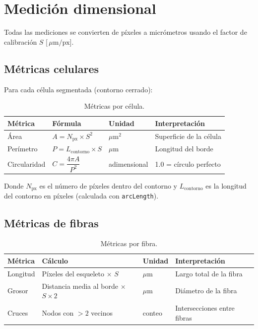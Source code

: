 \documentclass[11pt,a4paper]{article}
\newcommand{\umpx}{\,\mu\text{m/px}}
\begin{document}
\section{Medici\'{o}n dimensional}

Todas las mediciones se convierten de p\'{i}xeles a micr\'{o}metros usando el factor de calibraci\'{o}n $S$ [$\umpx$].

\subsection{M\'{e}tricas celulares}

Para cada c\'{e}lula segmentada (contorno cerrado):

\begin{table}[H]
\centering
\begin{tabular}{llll}
\toprule
\textbf{M\'{e}trica} & \textbf{F\'{o}rmula} & \textbf{Unidad} & \textbf{Interpretaci\'{o}n} \\
\midrule
\'{A}rea & $A = N_{\text{px}} \times S^2$ & $\mu\text{m}^2$ & Superficie de la c\'{e}lula \\
Per\'{i}metro & $P = L_{\text{contorno}} \times S$ & $\mu$m & Longitud del borde \\
Circularidad & $C = \dfrac{4\pi A}{P^2}$ & adimensional & 1.0 = c\'{i}rculo perfecto \\
\bottomrule
\end{tabular}
\caption{M\'{e}tricas por c\'{e}lula.}
\end{table}

Donde $N_{\text{px}}$ es el n\'{u}mero de p\'{i}xeles dentro del contorno y $L_{\text{contorno}}$ es la longitud del contorno en p\'{i}xeles (calculada con \texttt{arcLength}).

\subsection{M\'{e}tricas de fibras}

\begin{table}[H]
\centering
\begin{tabular}{llll}
\toprule
\textbf{M\'{e}trica} & \textbf{C\'{a}lculo} & \textbf{Unidad} & \textbf{Interpretaci\'{o}n} \\
\midrule
Longitud & P\'{i}xeles del esqueleto $\times$ $S$ & $\mu$m & Largo total de la fibra \\
Grosor & Distancia media al borde $\times$ $S \times 2$ & $\mu$m & Di\'{a}metro de la fibra \\
Cruces & Nodos con $>2$ vecinos & conteo & Intersecciones entre fibras \\
\bottomrule
\end{tabular}
\caption{M\'{e}tricas por fibra.}
\end{table}
\end{document}
